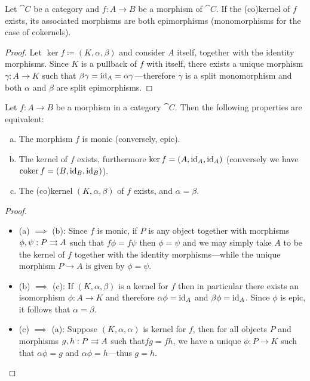 \begin{proposition}
    \label{prop:morphisms-kernel-cokernel}
    Let \(\cat C\) be a category and \(f: A \to B\) be a morphism of \(\cat C\). If
    the (co)kernel of \(f\) exists, its associated morphisms are both epimorphisms
    (monomorphisms for the case of cokernels).
\end{proposition}

\begin{proof}
    Let \(\ker f \coloneq (K, \alpha, \beta)\) and consider \(A\) itself, together
    with the identity morphisms. Since \(K\) is a pullback of \(f\) with itself,
    there exists a unique morphism \(\gamma: A \to K\) such that \(\beta \gamma =
    \operatorname{id}_A = \alpha \gamma\)---therefore \(\gamma\) is a split monomorphism and
    both \(\alpha\) and \(\beta\) are split epimorphisms.
\end{proof}

\begin{proposition}
    \label{prop:(co)kernel-properties}
    Let \(f: A \to B\) be a morphism in a category \(\cat C\). Then the following
    properties are equivalent:
    \begin{enumerate}[(a)]\setlength\itemsep{0em}
        \item The morphism \(f\) is monic (conversely, epic).
        \item The kernel of \(f\) exists, furthermore \(\ker f = (A, \operatorname{id}_A, \operatorname{id}_A)\)
              (conversely we have \(\operatorname{coker} f = (B, \operatorname{id}_B, \operatorname{id}_B)\)).
        \item The (co)kernel \((K, \alpha, \beta)\) of \(f\) exists, and
              \(\alpha = \beta\).
    \end{enumerate}
\end{proposition}

\begin{proof}
    \begin{itemize}\setlength\itemsep{0em}
        \item (a) \(\implies\) (b): Since \(f\) is monic, if \(P\) is any object
              together with morphisms \(\phi, \psi: P \rightrightarrows A\) such that
              \(f \phi = f \psi\) then \(\phi = \psi\) and we may simply take \(A\) to be
              the kernel of \(f\) together with the identity morphisms---while the unique
              morphism \(P \to A\) is given by \(\phi = \psi\).

        \item (b) \(\implies\) (c): If \((K, \alpha, \beta)\) is a kernel for \(f\) then
              in particular there exists an isomorphism \(\phi: A \to K\) and therefore
              \(\alpha \phi = \operatorname{id}_A\) and \(\beta \phi = \operatorname{id}_A\). Since \(\phi\) is
              epic, it follows that \(\alpha = \beta\).

        \item (c) \(\implies\) (a): Suppose \((K, \alpha, \alpha)\) is kernel for \(f\),
              then for all objects \(P\) and morphisms \(g, h: P \rightrightarrows A\) such that\(f g =
              f h\), we have a unique \(\phi: P \to K\) such that \(\alpha \phi = g\) and
              \(\alpha \phi = h\)---thus \(g = h\).
    \end{itemize}
\end{proof}

